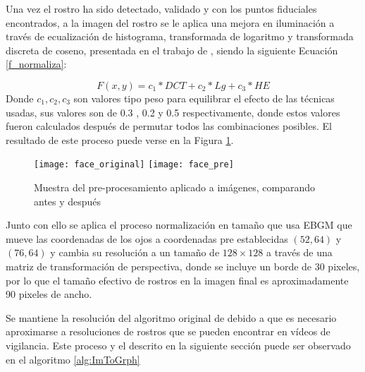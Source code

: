 Una vez el rostro ha sido detectado, validado y con los puntos fiduciales encontrados, a la imagen del rostro se le aplica una mejora en iluminación a través de ecualización de histograma, transformada de logaritmo y transformada discreta de coseno, presentada en el trabajo de \cite{manjulaimage}, siendo la siguiente Ecuación \ref{f_normaliza}:

\begin{equation}
	F(x,y) = c_{1}*DCT + c_{2}*Lg + c_{3}*HE
    \label{f_normaliza}
\end{equation}
Donde $c_{1}, c_{2}, c_{3}$ son valores tipo peso para equilibrar el efecto de las técnicas usadas, sus valores son de 0.3 , 0.2 y 0.5 respectivamente, donde estos valores fueron calculados después de permutar todos las combinaciones posibles. El resultado de este proceso puede verse en la Figura \ref{im:Preprocess}.

\begin{figure}[h]
\center
\texttt{[image: face\_original]}
\texttt{[image: face\_pre]}
\caption{Muestra del pre-procesamiento aplicado a imágenes, comparando antes y después}
\label{im:Preprocess}
\end{figure}

Junto con ello se aplica el proceso normalización en tamaño que usa \ac{EBGM} que mueve las coordenadas de los ojos a coordenadas pre establecidas $(52, 64)$ y $(76, 64)$ y cambia su resolución a un tamaño de $128 \times 128$ a través de una matriz de transformación de  perspectiva, donde se incluye un borde de 30 pixeles, por lo que el tamaño efectivo de rostros en la imagen final es aproximadamente 90 pixeles de ancho.

Se mantiene la resolución del algoritmo original de \cite{bolme2003elastic} debido a que es necesario aproximarse a resoluciones de rostros que se pueden encontrar en vídeos de vigilancia.
Este proceso y el descrito en la siguiente sección puede ser observado en el algoritmo \ref{alg:ImToGrph}

